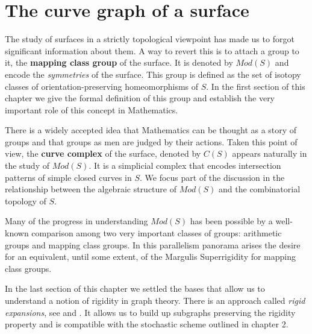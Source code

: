 
\chapter{The curve graph of a surface} %

\label{Chapter1} %



The study of surfaces in a strictly topological viewpoint has made us to forgot significant information about them. A way to revert this is to attach a group to it, the \textbf{mapping class group} of the surface. It is denoted by $Mod(S)$ and encode the \textit{symmetries} of the surface. This group is defined as the set of isotopy classes of orientation-preserving homeomorphisms of $S$. In the first section of this chapter we give the formal definition of this group and establish the very important role of this concept in Mathematics. 

There is a widely accepted idea that Mathematics can be thought as a story of groups and that groups as men are judged by their actions. Taken this point of view, the \textbf{curve complex} of the surface, denoted by $C(S)$ appears naturally in the study of $Mod(S)$. It is a simplicial complex that encodes intersection patterns of simple closed curves in $S$. We focus part of the discussion in the relationship between the algebraic structure of $Mod(S)$ and the combinatorial topology of $S$.

Many of the progress in understanding $Mod(S)$ has been possible by a well-known comparison among two very important classes of groups: arithmetic groups and mapping class groups. In this parallelism panorama arises the desire for an equivalent, until some extent, of the Margulis Superrigidity for mapping class groups.

In the last section of this chapter we settled the bases that allow us to understand a notion of rigidity in graph theory. There is an approach called \textit{rigid expansions}, see \cite[Aramayona 16]{rigidExpJA} and \cite[Hernandez 16]{rigidExpJH}. It allows us to build up subgraphs preserving the rigidity property and is compatible with the stochastic scheme outlined in chapter 2.
 
